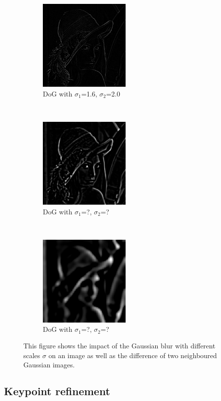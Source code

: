 \documentclass{article}
\begin{document}
\begin{figure}[ht]
\begin{center}
			\begin{subfigure}[normla]{0.3\textwidth}
				\includegraphics[width=4.5cm]{images/DoG_at_sigma_2.png}
				\caption{DoG with $\sigma_1$=1.6, $\sigma_2$=2.0}
				\label{subfig:org}
			\end{subfigure}
			~
			\begin{subfigure}[normla]{0.3\textwidth}
				\includegraphics[width=4.5cm]{images/DoG_at_sigma_5.png}
				\caption{DoG with $\sigma_1$=?, $\sigma_2$=?}
				\label{subfig:org}
			\end{subfigure}
			~
			\begin{subfigure}[normla]{0.3\textwidth}		
				\includegraphics[width=4.5cm]{images/DoG_at_sigma_13.png}
				\caption{DoG with $\sigma_1$=?, $\sigma_2$=?}
				\label{subfig:org}
			\end{subfigure}
		\caption{This figure shows the impact of the Gaussian blur with different scales $\sigma$ on an image  as well as the difference of two neighboured Gaussian images.}
		\end{center}
	\end{figure}
	
	\subsection{Keypoint refinement}
	
\end{document}

